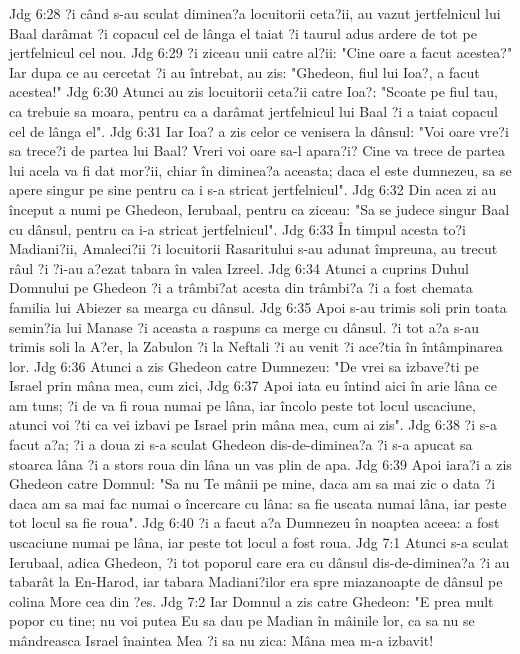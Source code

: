 Jdg 6:28  ?i când s-au sculat diminea?a locuitorii ceta?ii, au vazut jertfelnicul lui Baal darâmat ?i copacul cel de lânga el taiat ?i taurul adus ardere de tot pe jertfelnicul cel nou.
Jdg 6:29  ?i ziceau unii catre al?ii: "Cine oare a facut acestea?" Iar dupa ce au cercetat ?i au întrebat, au zis: "Ghedeon, fiul lui Ioa?, a facut acestea!"
Jdg 6:30  Atunci au zis locuitorii ceta?ii catre Ioa?: "Scoate pe fiul tau, ca trebuie sa moara, pentru ca a darâmat jertfelnicul lui Baal ?i a taiat copacul cel de lânga el".
Jdg 6:31  Iar Ioa? a zis celor ce venisera la dânsul: "Voi oare vre?i sa trece?i de partea lui Baal? Vreri voi oare sa-l apara?i? Cine va trece de partea lui acela va fi dat mor?ii, chiar în diminea?a aceasta; daca el este dumnezeu, sa se apere singur pe sine pentru ca i s-a stricat jertfelnicul".
Jdg 6:32  Din acea zi au început a numi pe Ghedeon, Ierubaal, pentru ca ziceau: "Sa se judece singur Baal cu dânsul, pentru ca i-a stricat jertfelnicul".
Jdg 6:33  În timpul acesta to?i Madiani?ii, Amaleci?ii ?i locuitorii Rasaritului s-au adunat împreuna, au trecut râul ?i ?i-au a?ezat tabara în valea Izreel.
Jdg 6:34  Atunci a cuprins Duhul Domnului pe Ghedeon ?i a trâmbi?at acesta din trâmbi?a ?i a fost chemata familia lui Abiezer sa mearga cu dânsul.
Jdg 6:35  Apoi s-au trimis soli prin toata semin?ia lui Manase ?i aceasta a raspuns ca merge cu dânsul. ?i tot a?a s-au trimis soli la A?er, la Zabulon ?i la Neftali ?i au venit ?i ace?tia în întâmpinarea lor.
Jdg 6:36  Atunci a zis Ghedeon catre Dumnezeu: "De vrei sa izbave?ti pe Israel prin mâna mea, cum zici,
Jdg 6:37  Apoi iata eu întind aici în arie lâna ce am tuns; ?i de va fi roua numai pe lâna, iar încolo peste tot locul uscaciune, atunci voi ?ti ca vei izbavi pe Israel prin mâna mea, cum ai zis".
Jdg 6:38  ?i s-a facut a?a; ?i a doua zi s-a sculat Ghedeon dis-de-diminea?a ?i s-a apucat sa stoarca lâna ?i a stors roua din lâna un vas plin de apa.
Jdg 6:39  Apoi iara?i a zis Ghedeon catre Domnul: "Sa nu Te mânii pe mine, daca am sa mai zic o data ?i daca am sa mai fac numai o încercare cu lâna: sa fie uscata numai lâna, iar peste tot locul sa fie roua".
Jdg 6:40  ?i a facut a?a Dumnezeu în noaptea aceea: a fost uscaciune numai pe lâna, iar peste tot locul a fost roua.
Jdg 7:1  Atunci s-a sculat Ierubaal, adica Ghedeon, ?i tot poporul care era cu dânsul dis-de-diminea?a ?i au tabarât la En-Harod, iar tabara Madiani?ilor era spre miazanoapte de dânsul pe colina More cea din ?es.
Jdg 7:2  Iar Domnul a zis catre Ghedeon: "E prea mult popor cu tine; nu voi putea Eu sa dau pe Madian în mâinile lor, ca sa nu se mândreasca Israel înaintea Mea ?i sa nu zica: Mâna mea m-a izbavit!
